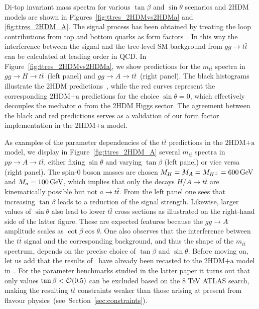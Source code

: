 \documentclass[a4paper, 11pt,notoc]{article}
\newcommand{\mA}{\ensuremath{M_{A}}\xspace}
\newcommand{\ma}{\ensuremath{M_{a}}\xspace}
\newcommand{\mH}{\ensuremath{M_{H}}\xspace}
\newcommand{\mHc}{\ensuremath{M_{H^{\pm}}}\xspace}
\newcommand{\hdma}{\ensuremath{\textrm{2HDM+a}}\xspace}
\begin{document}
Di-top invariant mass spectra for various $\tan \beta$ and $\sin \theta$ scenarios and 2HDM models are shown in Figures~\ref{fig:ttres_2HDMvs2HDMa} and \ref{fig:ttres_2HDM_A}. The signal process has been obtained by treating the loop contributions from top and bottom quarks as form factors~\cite{FranzosiZhang}. In this way the interference between the signal and the tree-level SM background from $gg \to t \bar t$ can be calculated at leading order in QCD. In Figure~\ref{fig:ttres_2HDMvs2HDMa}, we show predictions for the $m_{t \bar t}$ spectra in $gg \to H \to t \bar t$~(left panel) and $gg \to A \to t \bar t$~(right panel). The black histograms illustrate the 2HDM predictions~\cite{Aaboud:2017hnm}, while the red curves represent the corresponding \hdma predictions for the choice $\sin \theta = 0$, which effectively decouples the mediator $a$ from the 2HDM Higgs sector. The agreement between the black and red predictions serves as a validation of our form factor implementation in the \hdma model. 

As examples of the parameter dependencies of the $t \bar t$ predictions in the \hdma model, we display in  Figure~\ref{fig:ttres_2HDM_A} several $m_{t \bar t}$ spectra in $pp \to A \to t \bar t$, either fixing $\sin \theta$ and varying $\tan \beta$ (left panel) or vice versa (right panel). The  spin-0 boson  masses are chosen $\mH=\mA=\mHc =600 \, {\rm GeV}$ and $\ma=100 \, {\rm GeV}$, which implies that only the  decays $H/A \to t \bar t$  are kinematically possible but not $a \to t \bar t$.  From the left panel one sees that increasing $\tan \beta$ leads  to a reduction of the signal strength.  Likewise, larger values of $\sin \theta$ also lead to lower $t \bar t$ cross sections as illustrated on the right-hand side of the latter figure. These are expected features because the $g g \to A$ amplitude  scales as $\cot \beta \cos \theta$.  One also observes that the interference between the $t \bar t$ signal and the corresponding background, and thus the shape of the $m_{t \bar t}$ spectrum, depends on the precise choice of $\tan \beta$  and $\sin \theta$.  Before moving on, let us add that the results of~\cite{Aaboud:2017hnm} have already been recasted to the \hdma model in~\cite{Bauer:2017ota}. For the parameter benchmarks studied in the latter paper it turns out that only values $\tan \beta < {\cal O} ( 0.5)$ can be excluded based on the 8 TeV ATLAS search, making the resulting $t \bar t$ constraints weaker than those arising at present from flavour physics~(see~Section~\ref{sec:constraints}). 
\end{document}
